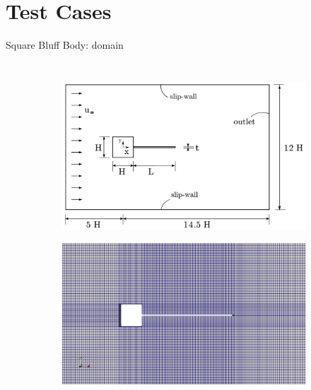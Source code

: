 \documentclass[10pt,t]{beamer}
\begin{document}
\section{Test Cases}

\begin{frame}{Square Bluff Body: domain}

\begin{columns}
    \begin{figure}[t]
    \vspace*{-1cm}
	\centering
	  \begin{subfigure}[t]{\textwidth}
    \centering
    \includegraphics[width=\linewidth, trim=0 0 0 0, clip]{images/sq-cyl/sq-cyl-domain.png}
  \end{subfigure}
  \hfill
  \begin{subfigure}[t]{\textwidth}
    \includegraphics[width=0.86\linewidth]{images/sq-cyl/sq_mesh.png}
  \end{subfigure}
	
	
	
	
    \end{figure}
    

\end{columns}
\end{frame}
\end{document}
